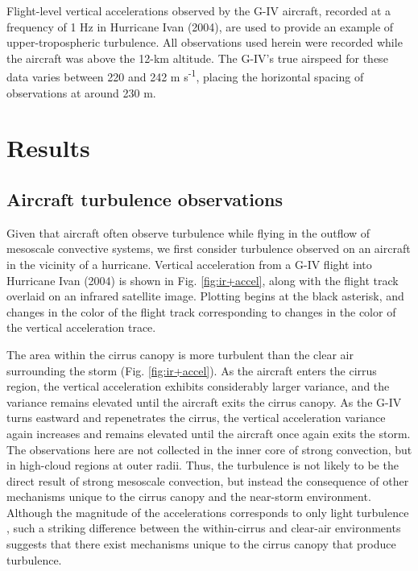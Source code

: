 Flight-level vertical accelerations observed by the G-IV aircraft, recorded at a frequency of 1 Hz in Hurricane Ivan (2004), are used to provide an example of upper-tropospheric turbulence.
All observations used herein were recorded while the aircraft was above the 12-km altitude.
The G-IV’s true airspeed for these data varies between 220 and 242 m s\textsuperscript{-1}, placing the horizontal spacing of observations at around 230 m.

\section{Results}
\label{section:resultssection}
\subsection{Aircraft turbulence observations}

Given that aircraft often observe turbulence while flying in the outflow of mesoscale convective systems, we first consider turbulence observed on an aircraft in the vicinity of a hurricane.
Vertical acceleration from a G-IV flight into Hurricane Ivan (2004) is shown in Fig. \ref{fig:ir+accel}, along with the flight track overlaid on an infrared satellite image.
Plotting begins at the black asterisk, and changes in the color of the flight track corresponding to changes in the color of the vertical acceleration trace.

The area within the cirrus canopy is more turbulent than the clear air surrounding the storm (Fig. \ref{fig:ir+accel}).
As the aircraft enters the cirrus region, the vertical acceleration exhibits considerably larger variance, and the variance remains elevated until the aircraft exits the cirrus canopy.
As the G-IV turns eastward and repenetrates the cirrus, the vertical acceleration variance again increases and remains elevated until the aircraft once again exits the storm.
The observations here are not collected in the inner core of strong convection, but in high-cloud regions at outer radii.
Thus, the turbulence is not likely to be the direct result of strong mesoscale convection, but instead the consequence of other mechanisms unique to the cirrus canopy and the near-storm environment.
Although the magnitude of the accelerations corresponds to only light turbulence \citep{WMO1998}, such a striking difference between the within-cirrus and clear-air environments suggests that there exist mechanisms unique to the cirrus canopy that produce turbulence.

